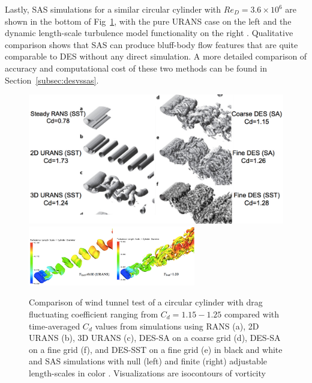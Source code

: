 \documentclass[journal]{new-aiaa}
\begin{document}
Lastly, SAS simulations for a similar circular cylinder with $Re_D=3.6 \times 10^6$ are shown in the bottom of Fig~\ref{fig:cylinderturbmodels}, with the pure URANS case on the left and the dynamic length-scale turbulence model functionality on the right \cite{menter2005scaleadaptive}. Qualitative comparison shows that SAS can produce bluff-body flow features that are quite comparable to DES without any direct simulation. A more detailed comparison of accuracy and computational cost of these two methods can be found in Section~\ref{subsec:desvssas}.



\begin{figure}[H]
\begin{center}
\includegraphics[width=1.0\textwidth]{Images/logan/spalart2009detachededdy_cylindersCD.pdf}
\includegraphics[width=0.65\textwidth]{Images/logan/menter2005scaleadaptive_cylinderwake.pdf}
\caption{ Comparison of wind tunnel test of a circular cylinder with drag fluctuating coefficient ranging from $C_d=1.15-1.25$ compared with time-averaged $C_d$ values from simulations using RANS (a), 2D URANS (b), 3D URANS (c), DES-SA on a coarse grid (d), DES-SA on a fine grid (f), and DES-SST on a fine grid (e) \cite{spalart2009detachededdy} in black and white and SAS simulations with null (left) and finite (right) adjustable length-scales in color \cite{menter2005scaleadaptive}. Visualizations are isocontours of vorticity }
\label{fig:cylinderturbmodels}
\end{center}
\end{figure}
\end{document}
